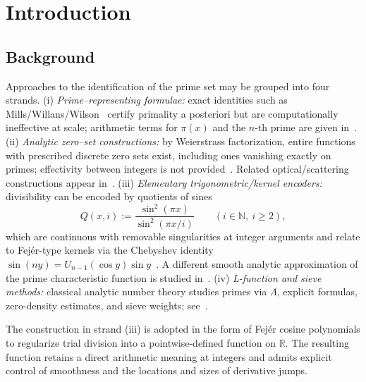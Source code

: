 \section{Introduction}

\subsection*{Background}
Approaches to the identification of the prime set may be grouped into four strands.
(i) \emph{Prime–representing formulae:} exact identities such as Mills/Willans/Wilson~\cite{mills1947,willans1964,hardy2008} certify primality a posteriori but are computationally ineffective at scale; arithmetic terms for $\pi(x)$ and the $n$-th prime are given in~\cite{prunescu2024}.
(ii) \emph{Analytic zero–set constructions:} by Weierstrass factorization, entire functions with prescribed discrete zero sets exist, including ones vanishing exactly on primes; effectivity between integers is not provided~\cite{boas1954}. Related optical/scattering constructions appear in~\cite{petersen2019,li2019-optical,zhang2018-structure,torquato2018-scattering}.
(iii) \emph{Elementary trigonometric/kernel encoders:} divisibility can be encoded by quotients of sines
\[
Q(x,i):=\frac{\sin^2(\pi x)}{\sin^2(\pi x/i)}\qquad(i\in\mathbb N,\ i\ge2),
\]
which are continuous with removable singularities at integer arguments and relate to Fejér-type kernels via the Chebyshev identity \(\sin(ny)=U_{n-1}(\cos y)\sin y\)~\cite{katznelson2004,zygmund2002}. A different smooth analytic approximation of the prime characteristic function is studied in~\cite{semenov2025}.
(iv) \emph{L-function and sieve methods:} classical analytic number theory studies primes via \(\Lambda\), explicit formulas, zero-density estimates, and sieve weights; see~\cite{iwaniec2004,montgomery2007}.  

The construction in strand (iii) is adopted in the form of Fejér cosine polynomials to regularize trial division into a pointwise-defined function on $\mathbb{R}$. The resulting function retains a direct arithmetic meaning at integers and admits explicit control of smoothness and the locations and sizes of derivative jumps.

